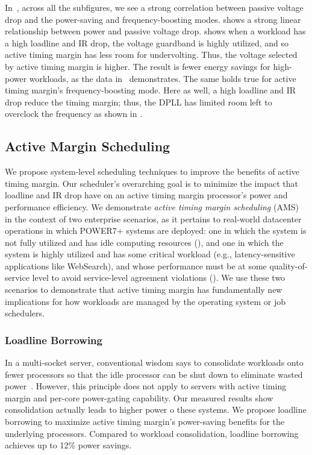 In~, across all the subfigures, we see a strong correlation between passive voltage drop and the power-saving and frequency-boosting modes.  shows a strong linear relationship between power and passive voltage drop.  shows when a workload has a high loadline and IR drop, the voltage guardband is highly utilized, and so active timing margin has less room for undervolting. Thus, the voltage selected by active timing margin is higher. The result is fewer energy savings for high-power workloads, as the data in~ demonstrates. The same holds true for active timing margin's frequency-boosting mode. Here as well, a high loadline and IR drop reduce the timing margin; thus, the DPLL has limited room left to overclock the frequency as shown in .

\subsection{Active Margin Scheduling}
\label{sec:ams:ams}

We propose system-level scheduling techniques to improve the benefits of active timing margin. Our scheduler's overarching goal is to minimize the impact that loadline and IR drop have on an active timing margin processor's power and performance efficiency. We demonstrate \emph{active timing margin scheduling} (AMS) in the context of two enterprise scenarios, as it pertains to real-world datacenter operations in which POWER7+ systems are deployed: one in which the system is not fully utilized and has idle computing resources (), and one in which the system is highly utilized and has some critical workload (e.g., latency-sensitive applications like WebSearch), and whose performance must be at some quality-of-service level to avoid service-level agreement violations (). We use these two scenarios to demonstrate that active timing margin has fundamentally new implications for how workloads are managed by the operating system or job schedulers.

\subsubsection{Loadline Borrowing}
\label{sec:ams:ams:loadline}

In a multi-socket server, conventional wisdom says to consolidate workloads onto fewer processors so that the idle processor can be shut down to eliminate wasted power~\cite{murthy2013linux,lo2014towards,leverich2014reconciling}. However, this principle does not apply to servers with active timing margin and per-core power-gating capability. Our measured results show consolidation actually leads to higher power o these systems. We propose loadline borrowing to maximize active timing margin's power-saving benefits for the underlying processors. Compared to workload consolidation, loadline borrowing achieves up to 12\% power savings.

